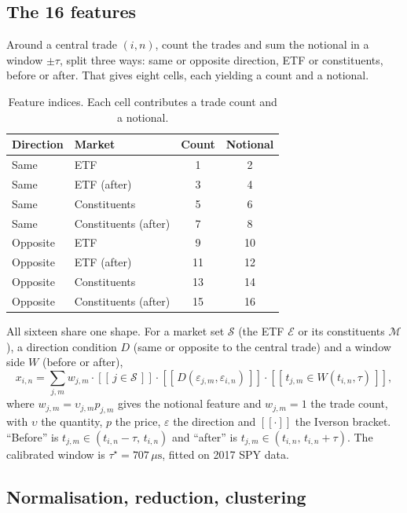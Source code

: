 \documentclass[11pt]{article}
\begin{document}
\subsection{The 16 features}

Around a central trade $(i,n)$, count the trades and sum the notional in a
window $\pm\tau$, split three ways: same or opposite direction, ETF or
constituents, before or after. That gives eight cells, each yielding a count and
a notional.

\begin{table}[h]
\centering
\captionsetup{font=small}
\caption{Feature indices. Each cell contributes a trade count and a notional.}
\small
\begin{tabular}{llcc}
\toprule
Direction & Market & Count & Notional \\
\midrule
Same & ETF & 1 & 2 \\
Same & ETF (after) & 3 & 4 \\
Same & Constituents & 5 & 6 \\
Same & Constituents (after) & 7 & 8 \\
Opposite & ETF & 9 & 10 \\
Opposite & ETF (after) & 11 & 12 \\
Opposite & Constituents & 13 & 14 \\
Opposite & Constituents (after) & 15 & 16 \\
\bottomrule
\end{tabular}
\end{table}

All sixteen share one shape. For a market set $\mathcal{S}$ (the ETF
$\mathcal{E}$ or its constituents $\mathcal{M}$), a direction condition $D$
(same or opposite to the central trade) and a window side $W$ (before or after),
\begin{equation}
x_{i,n}=\sum_{j,m} w_{j,m}\cdot
[\![\,j\in\mathcal{S}\,]\!]\cdot
[\![\,D(\varepsilon_{j,m},\varepsilon_{i,n})\,]\!]\cdot
[\![\,t_{j,m}\in W(t_{i,n},\tau)\,]\!],
\end{equation}
where $w_{j,m}=\upsilon_{j,m}p_{j,m}$ gives the notional feature and
$w_{j,m}=1$ the trade count, with $\upsilon$ the quantity, $p$ the price,
$\varepsilon$ the direction and $[\![\cdot]\!]$ the Iverson bracket. ``Before''
is $t_{j,m}\in(t_{i,n}-\tau,\,t_{i,n})$ and ``after'' is
$t_{j,m}\in(t_{i,n},\,t_{i,n}+\tau)$. The calibrated window is
$\tau^\star=707\,\mu\mathrm{s}$, fitted on 2017 SPY data.

\subsection{Normalisation, reduction, clustering}
\end{document}
